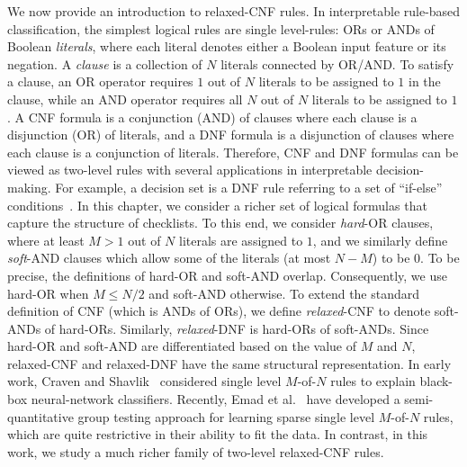 We now provide an introduction to relaxed-CNF rules. In interpretable rule-based classification, the simplest logical rules are single level-rules: ORs or ANDs of Boolean \textit{literals}, where each literal denotes either a Boolean input feature or its negation. A \emph{clause} is a collection of $ N $ literals connected by  OR/AND. To satisfy a clause, an OR operator requires $ 1 $ out of $ N $ literals to be assigned to  $ 1 $ in the clause, while an AND operator requires all $N$ out of $N$ literals to be assigned to  $ 1 $. A CNF   formula  is a conjunction (AND) of {clauses} where each clause is a disjunction (OR) of {literals}, and  a DNF  formula is a disjunction of clauses where each clause is a conjunction of literals. Therefore, CNF  and DNF  formulas can be viewed as two-level rules with several applications in interpretable decision-making. For example, a decision set is a DNF rule referring to a set of ``if-else'' conditions~\cite{ignatiev2018sat,lakkaraju2016interpretable}.  In this chapter, we consider a richer set of logical formulas that capture the structure of checklists. To this end, we consider \emph{hard}-OR clauses, where at least $ M > 1$ out of $ N $ literals are assigned to $ 1 $, and we similarly define {\emph{soft}-AND} clauses which allow some of the literals (at most $ N-M $) to be $ 0 $. To be precise,  the definitions of hard-OR and soft-AND overlap. Consequently, we use hard-OR when $M \le N/2$ and soft-AND otherwise. To extend the standard definition of CNF (which is ANDs of ORs),  we define \emph{relaxed}-CNF to denote soft-ANDs of hard-ORs. Similarly, \emph{relaxed}-DNF is hard-ORs of soft-ANDs. Since   hard-OR and soft-AND are differentiated based on the value of $ M $ and $ N $, relaxed-CNF and relaxed-DNF have the same structural representation. In early work, Craven and Shavlik~\cite{craven1996extracting} considered single level $ M $-of-$ N $ rules to explain black-box neural-network classifiers. Recently, Emad et al.~\cite{EVM2015} have developed a semi-quantitative group testing approach for learning sparse single level $M$-of-$N$ rules, which are quite restrictive in their ability to fit the data. In contrast, in this work, we study a much richer family of two-level relaxed-CNF rules. 






